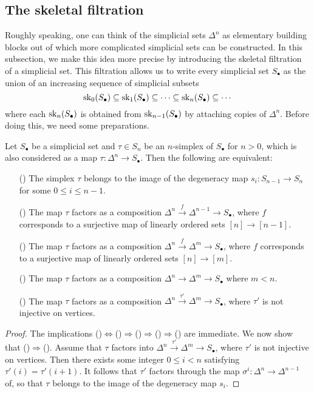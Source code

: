\subsection{The skeletal filtration}
Roughly speaking, one can think of the simplicial sets $\Delta^n$ as  elementary building blocks out of which more complicated simplicial sets can be constructed. In this subsection, we make this idea more precise by introducing the skeletal filtration of a simplicial set. This filtration allows us to write every simplicial set $S_\bullet$ as the union of an increasing sequence of simplicial subsets
\[\mathrm{sk}_0(S_\bullet)\subseteq \mathrm{sk}_1(S_\bullet)\subseteq\cdots\subseteq \mathrm{sk}_n(S_\bullet)\subseteq\cdots\]
where each $\mathrm{sk}_n(S_\bullet)$ is obtained from $\mathrm{sk}_{n-1}(S_\bullet)$ by attaching copies of $\Delta^n$. Before doing this, we need some preparations.
\begin{proposition}\label{simplicial set n-simplex image of n-1 iff}
Let $S_\bullet$ be a simplicial set and $\tau\in S_n$ be an $n$-simplex of $S_\bullet$ for $n>0$, which is also considered as a map $\tau:\Delta^n\to S_\bullet$. Then the following are equivalent:
\begin{itemize}
\item[(\rmnum{1})] The simplex $\tau$ belongs to the image of the degeneracy map $s_i:S_{n-1}\to S_n$ for some $0\leq i\leq n-1$.
\item[(\rmnum{2})] The map $\tau$ factors as a composition $\Delta^{n}\stackrel{f}{\to}\Delta^{n-1}\to S_\bullet$, where $f$ corresponds to a surjective map of linearly ordered sets $[n]\to[n-1]$.
\item[(\rmnum{3})] The map $\tau$ factors as a composition $\Delta^{n}\stackrel{f}{\to}\Delta^{m}\to S_\bullet$, where $f$ corresponds to a surjective map of linearly ordered sets $[n]\to[m]$.
\item[(\rmnum{4})] The map $\tau$ factors as a composition $\Delta^n\to\Delta^m\to S_\bullet$ where $m<n$.
\item[(\rmnum{5})] The map $\tau$ factors as a composition $\Delta^{n}\stackrel{\tau'}{\to}\Delta^{m}\to S_\bullet$, where $\tau'$ is not injective on vertices.
\end{itemize}
\end{proposition}
\begin{proof}
The implications ()$\Leftrightarrow$()$\Rightarrow$()$\Rightarrow$()$\Rightarrow$() are immediate. We now show that ()$\Rightarrow$(). Assume that $\tau$ factors into $\Delta^{n}\stackrel{\tau'}{\to}\Delta^{m}\to S_\bullet$, where $\tau'$ is not injective on vertices. Then there exists some integer $0\leq i<n$ satisfying $\tau'(i)=\tau'(i+1)$. It follows that $\tau'$ factors through the map $\sigma^i:\Delta^n\to\Delta^{n-1}$ of, so that $\tau$ belongs to the image of the degeneracy map $s_i$.
\end{proof}
